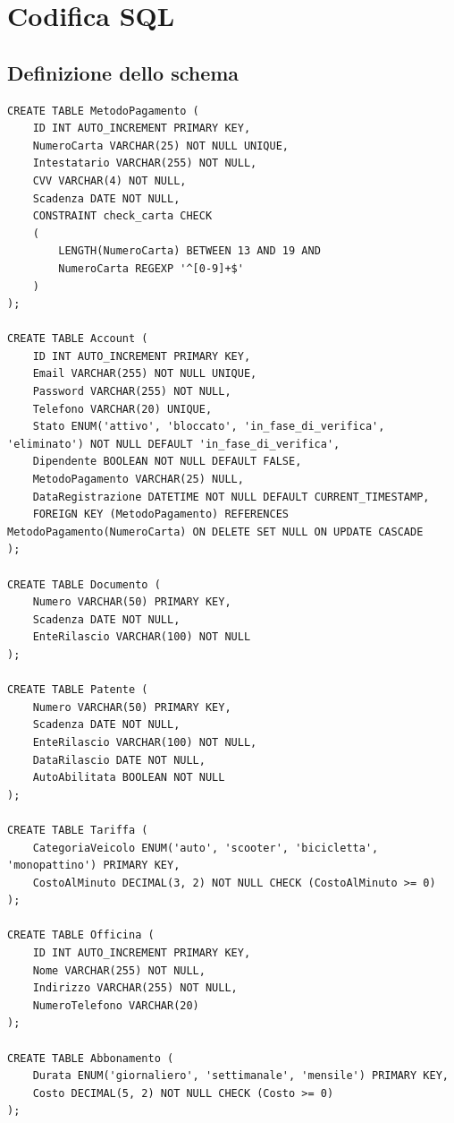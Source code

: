 \documentclass{article}
\begin{document}
\restoregeometry


\section{Codifica SQL}

\subsection{Definizione dello schema}

\begin{lstlisting}
CREATE TABLE MetodoPagamento (
    ID INT AUTO_INCREMENT PRIMARY KEY,
    NumeroCarta VARCHAR(25) NOT NULL UNIQUE,
    Intestatario VARCHAR(255) NOT NULL,
    CVV VARCHAR(4) NOT NULL, 
    Scadenza DATE NOT NULL, 
    CONSTRAINT check_carta CHECK 
    (
        LENGTH(NumeroCarta) BETWEEN 13 AND 19 AND 
        NumeroCarta REGEXP '^[0-9]+$'
    )
);

CREATE TABLE Account (
    ID INT AUTO_INCREMENT PRIMARY KEY,
    Email VARCHAR(255) NOT NULL UNIQUE,
    Password VARCHAR(255) NOT NULL, 
    Telefono VARCHAR(20) UNIQUE,
    Stato ENUM('attivo', 'bloccato', 'in_fase_di_verifica', 'eliminato') NOT NULL DEFAULT 'in_fase_di_verifica',
    Dipendente BOOLEAN NOT NULL DEFAULT FALSE, 
    MetodoPagamento VARCHAR(25) NULL,
    DataRegistrazione DATETIME NOT NULL DEFAULT CURRENT_TIMESTAMP,
    FOREIGN KEY (MetodoPagamento) REFERENCES MetodoPagamento(NumeroCarta) ON DELETE SET NULL ON UPDATE CASCADE
);

CREATE TABLE Documento (
    Numero VARCHAR(50) PRIMARY KEY,
    Scadenza DATE NOT NULL,
    EnteRilascio VARCHAR(100) NOT NULL
);

CREATE TABLE Patente (
    Numero VARCHAR(50) PRIMARY KEY,
    Scadenza DATE NOT NULL,
    EnteRilascio VARCHAR(100) NOT NULL,
    DataRilascio DATE NOT NULL,
    AutoAbilitata BOOLEAN NOT NULL 
);

CREATE TABLE Tariffa (
    CategoriaVeicolo ENUM('auto', 'scooter', 'bicicletta', 'monopattino') PRIMARY KEY,
    CostoAlMinuto DECIMAL(3, 2) NOT NULL CHECK (CostoAlMinuto >= 0)
);

CREATE TABLE Officina (
    ID INT AUTO_INCREMENT PRIMARY KEY,
    Nome VARCHAR(255) NOT NULL,
    Indirizzo VARCHAR(255) NOT NULL,
    NumeroTelefono VARCHAR(20)
);

CREATE TABLE Abbonamento (
    Durata ENUM('giornaliero', 'settimanale', 'mensile') PRIMARY KEY, 
    Costo DECIMAL(5, 2) NOT NULL CHECK (Costo >= 0)
);


\end{lstlisting}
\end{document}
